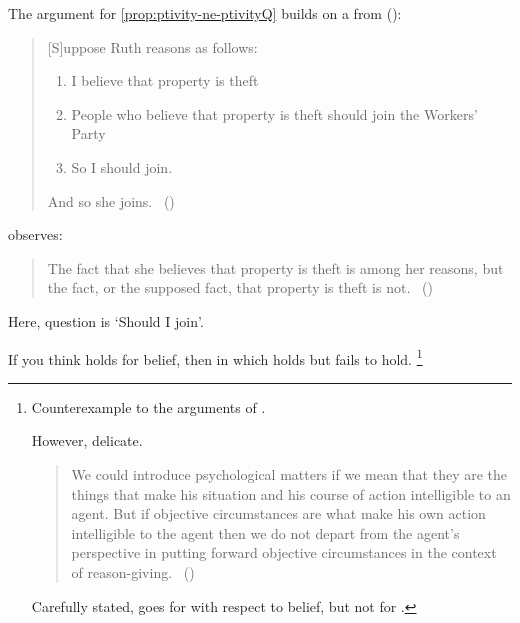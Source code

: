 \begin{note}
  The argument for \autoref{prop:ptivity-ne-ptivityQ} builds on a  from \citeauthor{Hyman:1999tm} (\citeyear{Hyman:1999tm}):

  \begin{quote}
    [S]uppose Ruth reasons as follows:

    \begin{enumerate}[label=, noitemsep]
    \item
      I believe that property is theft
    \item
      People who believe that property is theft should join the Workers’ Party
    \item
      So I should join.
    \end{enumerate}

    And so she joins.%
    \mbox{ }\hfill\mbox{(\citeyear[444]{Hyman:1999tm})}
  \end{quote}

  \citeauthor{Hyman:1999tm} observes:

  \begin{quote}
    The fact that she believes that property is theft is among her reasons, but the fact, or the supposed fact, that property is theft is not.%
    \mbox{ }\hfill\mbox{(\citeyear[444]{Hyman:1999tm})}
  \end{quote}

  Here, question is `Should I join'.

  If you think \ptivity{} holds for belief, then \scen{} in which \ptivity{} holds but \ptivityQ{} fails to hold.%
  \footnote{
    Counterexample to the arguments of \citeauthor{Collins:1997wn}.

    However, delicate.

    \begin{quote}
      We could introduce psychological matters if we mean that they are the things that make his situation and his course of action intelligible to an agent.
      But if objective circumstances are what make his own action intelligible to the agent then we do not depart from the agent's perspective in putting forward objective circumstances in the context of reason-giving.%
      \mbox{ }\hfill\mbox{(\citeyear[120]{Collins:1997wn})}
    \end{quote}

    Carefully stated, \citeauthor{Collins:1997wn} goes for \ptivity{} with respect to belief, but not for  \ptivityQ{}.

}
\end{note}
